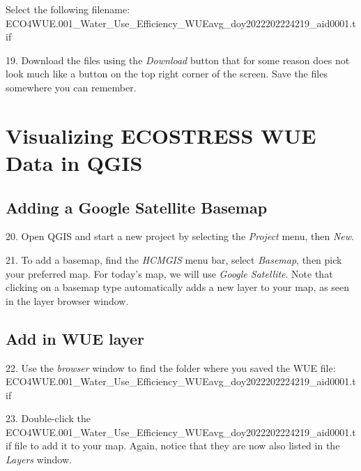 \documentclass[oneside,a4paper,11pt,explicit]{book}
\begin{document}
Select the following filename: ECO4WUE.001\_Water\_Use\_Efficiency\_WUEavg\_doy2022202224219\_aid0001.tif




19. Download the files using the \textit{Download} button that for some reason does not look much like a button on the top right corner of the screen. Save the files somewhere you can remember. 

\section{Visualizing ECOSTRESS WUE Data in QGIS}

\subsection{Adding a Google Satellite Basemap}

20. Open QGIS and start a new project by selecting the \textit{Project} menu, then \textit{New}.

21. To add a basemap, find the \textit{HCMGIS} menu bar, select \textit{Basemap}, then pick your preferred map. For today's map, we will use \textit{Google Satellite}. Note that clicking on a basemap type automatically adds a new layer to your map, as seen in the layer browser window.


\subsection{Add in WUE layer}


22. Use the \textit{browser} window to find the folder where you saved the WUE file: \\ ECO4WUE.001\_Water\_Use\_Efficiency\_WUEavg\_doy2022202224219\_aid0001.tif

23. Double-click the ECO4WUE.001\_Water\_Use\_Efficiency\_WUEavg\_doy2022202224219\_aid0001.tif file to add it to your map. Again, notice that they are now also listed in the \textit{Layers} window.

\end{document}
